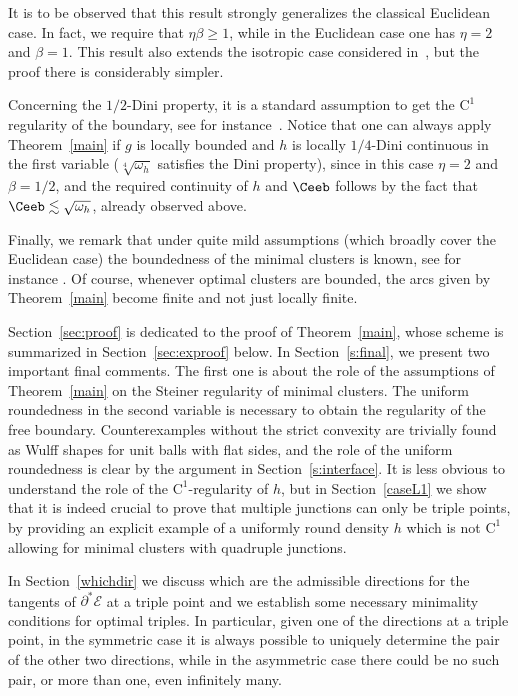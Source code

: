 It is to be observed that this result strongly generalizes the classical Euclidean case. In fact, we require that $\eta\beta\geq 1$, while in the Euclidean case one has $\eta=2$ and $\beta=1$. This result also extends the isotropic case considered in~\cite{FPS1}, but the proof there is considerably simpler.

Concerning the $1/2$-Dini property, it is a standard assumption to get the $\mathrm{C}^1$ regularity of the boundary, see for instance~\cite{Tam,Mag}. Notice that one can always apply Theorem~\ref{main} if $g$ is locally bounded and $h$ is locally $1/4$-Dini continuous in the first variable (\ie $\sqrt[4]{\omega_h}$ satisfies the Dini property), since in this case $\eta=2$ and $\beta=1/2$, and the required continuity of $h$ and $\Ceeb$ follows by the fact that $\Ceeb\lesssim \sqrt{\omega_h}$, already observed above.

Finally, we remark that under quite mild assumptions (which broadly cover the Euclidean case) the boundedness of the minimal clusters is known, see for instance \hbox{\cite{CP,DFP,PS18,PS19}}. Of course, whenever optimal clusters are bounded, the arcs given by Theorem~\ref{main} become finite and not just locally finite.

Section~\ref{sec:proof} is dedicated to the proof of Theorem~\ref{main}, whose scheme is summarized in Section~\ref{sec:exproof} below. In Section~\ref{s:final}, we present two important final comments. The first one is about the role of the assumptions of Theorem~\ref{main} on the Steiner regularity of minimal clusters. The uniform roundedness in the second variable is necessary to obtain the regularity of the free boundary. Counterexamples without the strict convexity are trivially found as Wulff shapes for unit balls with flat sides, and the role of the uniform roundedness is clear by the argument in Section~\ref{s:interface}. It is less obvious to understand the role of the $\mathrm{C}^1$-regularity of $h$, but in Section~\ref{caseL1} we show that it is indeed crucial to prove that multiple junctions can only be triple points, by providing an explicit example of a uniformly round density $h$ which is not $\mathrm{C}^1$ allowing for minimal clusters with quadruple junctions.

In Section~\ref{whichdir} we discuss which are the admissible directions for the tangents of $\partial^*\mathcal E$ at a triple point and we establish some necessary minimality conditions for optimal triples. In particular, given one of the directions at a triple point, in the symmetric case it is always possible to uniquely determine the pair of the other two directions, while in the asymmetric case there could be no such pair, or more than one, even infinitely many.

